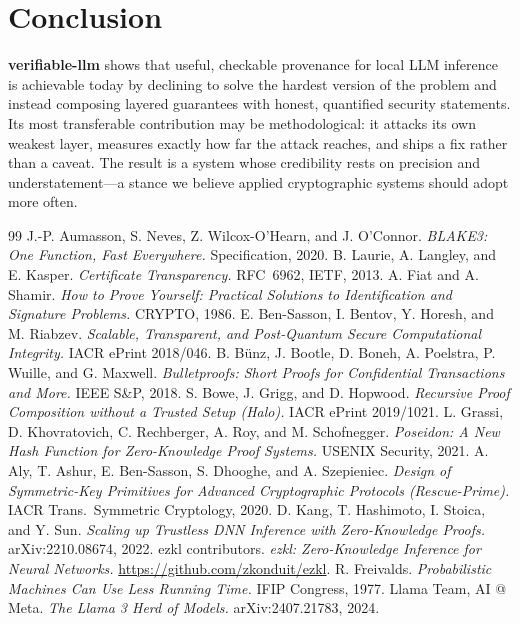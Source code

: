 \documentclass[11pt]{article}
\begin{document}
\section{Conclusion}\label{sec:conclusion}

\textbf{verifiable-llm} shows that useful, checkable provenance for local LLM
inference is achievable today by declining to solve the hardest version of the
problem and instead composing layered guarantees with honest, quantified
security statements. Its most transferable contribution may be methodological:
it attacks its own weakest layer, measures exactly how far the attack reaches,
and ships a fix rather than a caveat. The result is a system whose credibility
rests on precision and understatement---a stance we believe applied
cryptographic systems should adopt more often.

\begin{thebibliography}{99}
\small
{} J.-P. Aumasson, S. Neves, Z. Wilcox-O'Hearn, and J. O'Connor.
\emph{BLAKE3: One Function, Fast Everywhere.} Specification, 2020.
 B. Laurie, A. Langley, and E. Kasper. \emph{Certificate
Transparency.} RFC~6962, IETF, 2013.
 A. Fiat and A. Shamir. \emph{How to Prove Yourself:
Practical Solutions to Identification and Signature Problems.} CRYPTO, 1986.
 E. Ben-Sasson, I. Bentov, Y. Horesh, and M. Riabzev.
\emph{Scalable, Transparent, and Post-Quantum Secure Computational Integrity.}
IACR ePrint 2018/046.
 B. B\"unz, J. Bootle, D. Boneh, A. Poelstra, P. Wuille,
and G. Maxwell. \emph{Bulletproofs: Short Proofs for Confidential Transactions
and More.} IEEE S\&P, 2018.
 S. Bowe, J. Grigg, and D. Hopwood. \emph{Recursive Proof
Composition without a Trusted Setup (Halo).} IACR ePrint 2019/1021.
 L. Grassi, D. Khovratovich, C. Rechberger, A. Roy, and
M. Schofnegger. \emph{Poseidon: A New Hash Function for Zero-Knowledge Proof
Systems.} USENIX Security, 2021.
 A. Aly, T. Ashur, E. Ben-Sasson, S. Dhooghe, and
A. Szepieniec. \emph{Design of Symmetric-Key Primitives for Advanced
Cryptographic Protocols (Rescue-Prime).} IACR Trans.\ Symmetric Cryptology,
2020.
 D. Kang, T. Hashimoto, I. Stoica, and Y. Sun. \emph{Scaling up
Trustless DNN Inference with Zero-Knowledge Proofs.} arXiv:2210.08674, 2022.
 ezkl contributors. \emph{ezkl: Zero-Knowledge Inference for Neural
Networks.} \url{https://github.com/zkonduit/ezkl}.
 R. Freivalds. \emph{Probabilistic Machines Can Use Less
Running Time.} IFIP Congress, 1977.
 Llama Team, AI @ Meta. \emph{The Llama 3 Herd of Models.}
arXiv:2407.21783, 2024.
\end{thebibliography}
\end{document}
